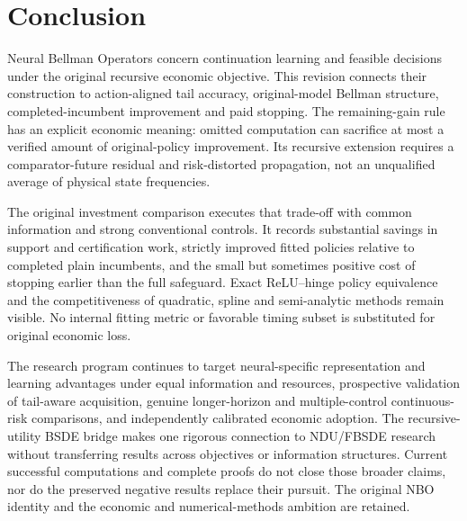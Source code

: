 \section{Conclusion}\label{sec:conclusion110}
Neural Bellman Operators concern continuation learning and feasible decisions under the original recursive economic objective. This revision connects their construction to action-aligned tail accuracy, original-model Bellman structure, completed-incumbent improvement and paid stopping. The remaining-gain rule has an explicit economic meaning: omitted computation can sacrifice at most a verified amount of original-policy improvement. Its recursive extension requires a comparator-future residual and risk-distorted propagation, not an unqualified average of physical state frequencies.

The original investment comparison executes that trade-off with common information and strong conventional controls. It records substantial savings in support and certification work, strictly improved fitted policies relative to completed plain incumbents, and the small but sometimes positive cost of stopping earlier than the full safeguard. Exact ReLU--hinge policy equivalence and the competitiveness of quadratic, spline and semi-analytic methods remain visible. No internal fitting metric or favorable timing subset is substituted for original economic loss.

The research program continues to target neural-specific representation and learning advantages under equal information and resources, prospective validation of tail-aware acquisition, genuine longer-horizon and multiple-control continuous-risk comparisons, and independently calibrated economic adoption. The recursive-utility BSDE bridge makes one rigorous connection to NDU/FBSDE research without transferring results across objectives or information structures. Current successful computations and complete proofs do not close those broader claims, nor do the preserved negative results replace their pursuit. The original NBO identity and the economic and numerical-methods ambition are retained.

